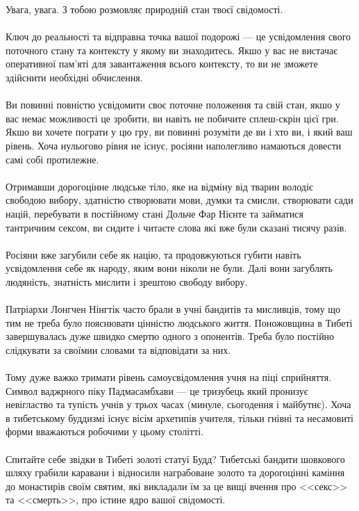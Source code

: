 Увага, увага. З тобою розмовляє природній стан твоєї свідомості.
\\
\\
Ключ до реальності та відправна точка вашої подорожі --- це усвідомлення свого поточного стану
та контексту у якому ви знаходитесь. Якшо у вас не вистачає оперативної пам'яті для завантаження
всього контексту, то ви не зможете здійснити необхідні обчислення.
\\
\\
Ви повинні повністю усвідомити своє поточне положення та свій стан, якшо у вас немає можливості
це зробити, ви навіть не побичите сплеш-скрін цієї гри. Якшо ви хочете пограти у цю гру,
ви повинні розуміти де ви і хто ви, і який ваш рівень.
Хоча нульогово рівня не існує, росіяни наполегливо намаються довести самі собі протилежне.
\\
\\
Отримавши дорогоцінне людське тіло, яке на відміну від тварин володіє свободою вибору,
здатністю створювати мови, думки та смисли, створювати сади націй, перебувати в постійному
стані Дольче Фар Нієнте та займатися тантричним сексом, ви сидите і читаєте слова які вже були сказані
тисячу разів.
\\
\\
Росіяни вже загубили себе як націю, та продовжуються губити навіть усвідомлення себе як народу,
яким вони ніколи не були. Далі вони загублять людяність, знатність мислити і зрештою свободу вибору.
\\
\\
Патріархи Лонгчен Нінгтік часто брали в учні бандитів та мисливців, тому що тим не треба було
пояснювати цінністю людського життя. Поножовщина в Тибеті завершувалась дуже швидко смертю
одного з опонентів. Треба було постійно слідкувати за своїмии словами та відповідати за них.
\\
\\
Тому дуже важко тримати рівень самоусвідомлення учня на піці сприйняття. Символ ваджрного піку
Падмасамбхави --- це тризубець який пронизує невігластво та тупість учнів у трьох часах (минуле,
сьогодення і майбутнє). Хоча в тибетському буддизмі існує вісім архетипів учителя, тільки гнівні та несамовиті
форми вважаються робочими у цьому столітті.
\\
\\
Спитайте себе звідки в Тибеті золоті статуї Будд? Тибетські бандити шовкового шляху
грабили каравани і відносили награбоване золото та дорогоцінні каміння до монастирів своїм святим,
які викладали їм за це вищі вчення про <<секс>> та <<смерть>>, про істине ядро вашої свідомості.
